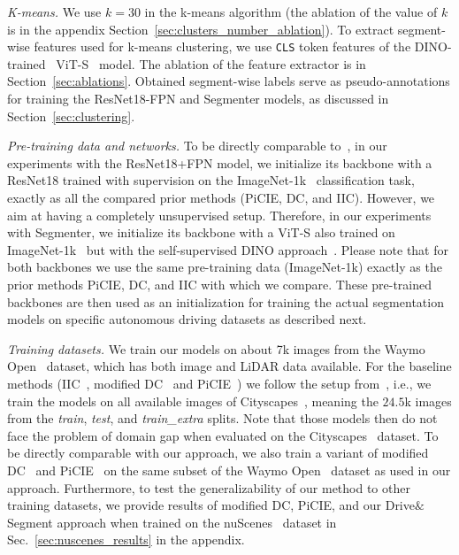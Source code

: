 \documentclass[runningheads]{llncs}
\newcommand{\ours}{Drive$\&$Segment\xspace}
\newcommand{\supp}{appendix\xspace}
\begin{document}
\emph{K-means.} We use $k=30$ in the k-means algorithm (the ablation of the value of $k$ is in the 
\supp
Section~\ref{sec:clusters_number_ablation}). To extract segment-wise features used for k-means clustering, we use \texttt{CLS} token features of the DINO-trained~\cite{caron2021emerging} ViT-S~\cite{dosovitskiy2021image} model. The ablation of the feature extractor is in Section~\ref{sec:ablations}. Obtained segment-wise labels serve as pseudo-annotations for training the ResNet18-FPN and Segmenter models, as discussed in Section~\ref{sec:clustering}.


\emph{Pre-training data and networks.}
To be directly comparable to~\cite{cho2021picie}, in our experiments with the ResNet18+FPN model, we initialize its backbone with a ResNet18 trained with supervision on the ImageNet-1k~\cite{deng2009imagenet} classification task, exactly as all the compared prior methods (PiCIE, DC, and IIC). However, we aim at having a completely unsupervised setup. Therefore, in our experiments with Segmenter, we initialize its backbone with a ViT-S also trained on ImageNet-1k~\cite{deng2009imagenet} but with the self-supervised DINO approach~\cite{caron2021emerging}. Please note that for both backbones we use the same pre-training data (ImageNet-1k) exactly as the prior methods PiCIE, DC, and IIC with which we compare.
These pre-trained backbones are then used as an initialization for training the actual segmentation models on specific autonomous driving datasets as described next.

\emph{Training datasets.}
We train our models on about 7k images from the Waymo Open~\cite{sun2020scalability} dataset, which has both image and LiDAR data available.
For the baseline methods (IIC~\cite{ji2019invariant}, modified DC~\cite{caron2018deep} and PiCIE~\cite{cho2021picie}) we follow the setup from~\cite{cho2021picie}, i.e., we train the models on all available images of Cityscapes~\cite{Cordts2016Cityscapes}, meaning the $24.5$k images from the \textit{train}, \textit{test}, and \textit{train\_extra} splits. Note that those models then do not face the problem of domain gap when evaluated on the Cityscapes~\cite{Cordts2016Cityscapes} dataset.
To be directly comparable with our approach, we also train a variant of modified DC~\cite{caron2018deep} and PiCIE~\cite{cho2021picie} on the same subset of the Waymo Open~\cite{sun2020scalability} dataset as used in our approach. 
Furthermore, to test the generalizability of our method to other training datasets, we provide results of modified DC, PiCIE, and our \ours approach when trained on the nuScenes~\cite{nuscenes} dataset in Sec.~\ref{sec:nuscenes_results} in the 
\supp.
\end{document}
